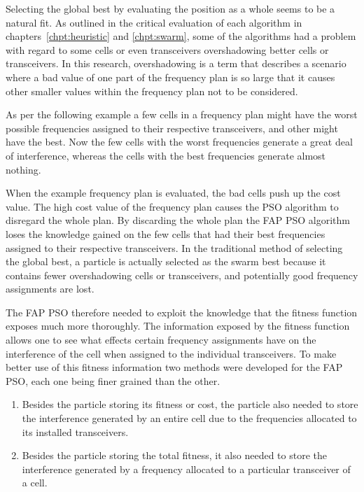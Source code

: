 Selecting the global best by evaluating the position as a whole seems to be a natural fit. As outlined in the critical evaluation of each algorithm in chapters~\ref{chpt:heuristic} and \ref{chpt:swarm}, some of the algorithms had a problem with regard to some cells or even transceivers overshadowing better cells or transceivers. In this research, overshadowing is a term that describes a scenario where a bad value of one part of the frequency plan is so large that it causes other smaller values within the frequency plan not to be considered. 

As per the following example a few cells in a frequency plan might have the worst possible frequencies assigned to their respective transceivers, and other might have the best. Now the few cells with the worst frequencies generate a great deal of interference, whereas the cells with the best frequencies generate almost nothing.

When the example frequency plan is evaluated, the bad cells push up the cost value. The high cost value of the frequency plan causes the \gls{PSO} algorithm to disregard the whole plan. By discarding the whole plan the \gls{FAP} \gls{PSO} algorithm loses the knowledge gained on the few cells that had their best frequencies assigned to their respective transceivers. In the traditional method of selecting the global best, a particle is actually selected as the swarm best because it contains fewer overshadowing cells or transceivers, and potentially good frequency assignments are lost.

The \gls{FAP} \gls{PSO} therefore needed to exploit the knowledge that the fitness function exposes much more thoroughly. The information exposed by the fitness function allows one to see what effects certain frequency assignments have on the interference of the cell when assigned to the individual transceivers. To make better use of this fitness information two methods were developed for the \gls{FAP} \gls{PSO}, each one being finer grained than the other.

\begin{enumerate}
\item Besides the particle storing its fitness or cost, the particle also needed to store the interference generated by an entire cell due to the frequencies allocated to its installed transceivers.
\item Besides the particle storing the total fitness, it also needed to store the interference generated by a frequency allocated to a particular transceiver of a cell.
\end{enumerate}

